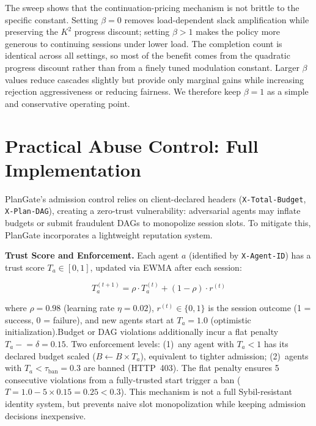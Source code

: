 \documentclass[sigconf,anonymous]{acmart}
\begin{document}
The sweep shows that the continuation-pricing mechanism is not brittle to the specific constant. Setting $\beta{=}0$ removes load-dependent slack amplification while preserving the $K^2$ progress discount; setting $\beta{>}1$ makes the policy more generous to continuing sessions under lower load. The completion count is identical across all settings, so most of the benefit comes from the quadratic progress discount rather than from a finely tuned modulation constant. Larger $\beta$ values reduce cascades slightly but provide only marginal gains while increasing rejection aggressiveness or reducing fairness. We therefore keep $\beta{=}1$ as a simple and conservative operating point.


\section{Practical Abuse Control: Full Implementation}
\label{sec:reputation_appendix}
\label{app:reputation}

PlanGate's admission control relies on client-declared headers (\texttt{X-Total-Budget}, \texttt{X-Plan-DAG}), creating a zero-trust vulnerability: adversarial agents may inflate budgets or submit fraudulent DAGs to monopolize session slots. To mitigate this, PlanGate incorporates a lightweight reputation system.

\textbf{Trust Score and Enforcement.}
Each agent $a$ (identified by \texttt{X-Agent-ID}) has a trust score $T_a \in [0, 1]$, updated via EWMA after each session:

\begin{equation}
T_a^{(t+1)} = \rho \cdot T_a^{(t)} + (1 - \rho) \cdot r^{(t)}
\end{equation}

\noindent where $\rho = 0.98$ (learning rate $\eta{=}0.02$), $r^{(t)} \in \{0, 1\}$ is the session outcome (1 = success, 0 = failure), and new agents start at $T_a = 1.0$ (optimistic initialization).Budget or DAG violations additionally incur a flat penalty $T_a \mathrel{-}= \delta{=}0.15$. Two enforcement levels: (1)~any agent with $T_a < 1$ has its declared budget scaled ($B \leftarrow B \times T_a$), equivalent to tighter admission; (2)~agents with $T_a < \tau_{\text{ban}}{=}0.3$ are banned (HTTP~403). The flat penalty ensures 5 consecutive violations from a fully-trusted start trigger a ban ($T = 1.0 - 5{\times}0.15 = 0.25 < 0.3$). This mechanism is not a full Sybil-resistant identity system, but prevents naive slot monopolization while keeping admission decisions inexpensive.
\end{document}
